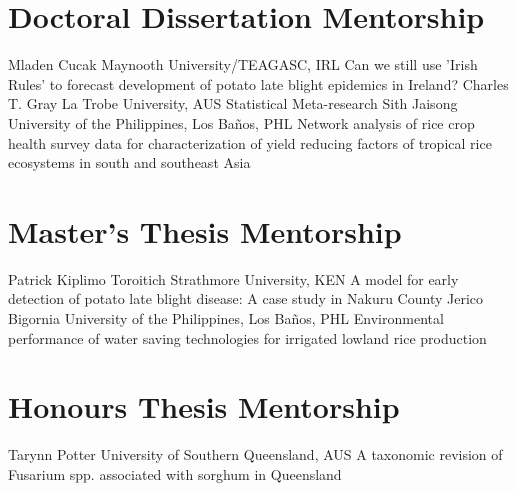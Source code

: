 \section*{Doctoral Dissertation Mentorship}
\begin{entrylist}
    {Mladen Cucak {}}
    {Maynooth University/TEAGASC, IRL}
    {Can we still use 'Irish Rules' to forecast development of potato late blight epidemics in Ireland?}
    {Charles T. Gray {}}
    {La Trobe University, AUS}
    {Statistical Meta-research}
    {Sith Jaisong {}}
    {University of the Philippines, Los Ba\~nos, PHL}
    {Network analysis of rice crop health survey data for characterization of yield reducing factors of tropical rice ecosystems in south and southeast Asia}
\end{entrylist}

\section*{Master's Thesis Mentorship}
\begin{entrylist}
    {Patrick Kiplimo Toroitich {}}
    {Strathmore University, KEN}
    {A model for early detection of potato late blight disease: A case study in Nakuru County}
    {Jerico Bigornia {}}
    {University of the Philippines, Los Ba\~nos, PHL}
    {Environmental performance of water saving technologies for irrigated lowland rice production}
\end{entrylist}

\section*{Honours Thesis Mentorship}
\begin{entrylist}
    {Tarynn Potter {}}
    {University of Southern Queensland, AUS}
    {A taxonomic revision of Fusarium spp. associated with sorghum in Queensland}
\end{entrylist}

